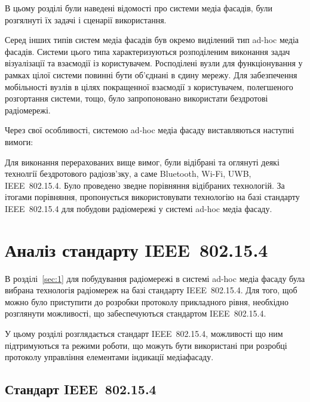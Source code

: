 \documentclass[a4paper,ukrainian,utf8,nocolumnsxix,floatsection,equationsection]{eskdtext}
\let\stdsection\section
\renewcommand\section{\clearpage\stdsection}
\newcommand{\iee}[0]{IEEE~802.15.4\xspace}
\begin{document}
В цьому розділі були наведені відомості про системи медіа фасадів, були розгялнуті їх задачі і сценарії використання. 

Серед інших типів систем медіа фасадів був окремо виділений тип ad-hoc медіа фасадів. Системи цього типа характеризуються розподіленим виконання задач візуалізації та взаємодії із користувачем. Росподілені вузли для функціонування у рамках цілої системи повинні бути об’єднані в єдину мережу. Для забезпечення мобільності вузлів в цілях покращенної взаємодії з користувачем, полегшеного розгортання системи, тощо, було запропоновано використати бездротові радіомережі.

Через свої особливості, системою ad-hoc медіа фасаду виставляються наступні вимоги:\todo{}

Для виконання перерахованих вище вимог, були відібрані та оглянуті деякі технолгії бездротового радіозв’зку, а саме Bluetooth, Wi-Fi, UWB, \iee. Було проведено зведне порівняння відібраних технологій. За ітогами порівняння, пропонується використовувати технологію на базі стандарту \iee для побудови радіомережі у системі ad-hoc медіа фасаду. 



\section{Аналіз стандарту \iee}
\label{sec:ieee:standard:analysis}

В розділі~\ref{sec:1} для побудування радіомережі в системі ad-hoc медіа фасаду була вибрана технологія радіомереж на базі стандарту \iee. Для того, щоб можно було приступити до розробки протоколу прикладного рівня, необхідно розглянути можливості, що забеспечуються стандартом \iee.

У цьому розділі розглядається стандарт \iee, можливості що ним підтримуються та режими роботи, що можуть бути використані при розробці протоколу управління елементами індикації медіафасаду. 


\subsection{Стандарт \iee}
\label{sub:ieee:standard}
\end{document}
